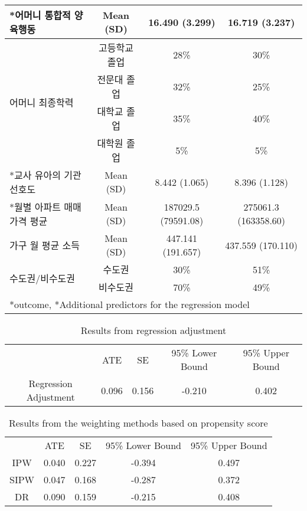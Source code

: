 \documentclass{article}
\begin{document}
\begin{table}[t]
{\begin{tabular}{l||c|c|c}
*어머니 통합적 양육행동             & Mean (SD) & 16.490 (3.299)      & 16.719 (3.237)       \\ \hline
\multirow{4}{*}{어머니 최종학력} & 고등학교 졸업   & 28\%                & 30\%                 \\ \cline{2-4} 
                          & 전문대 졸업    & 32\%                & 25\%                 \\ \cline{2-4} 
                          & 대학교 졸업    & 35\%                & 40\%                 \\ \cline{2-4} 
                          & 대학원 졸업    & 5\%                 & 5\%                  \\ \hline
*교사 유아의 기관선호도             & Mean (SD) & 8.442 (1.065)       & 8.396 (1.128)        \\ \hline
*월별 아파트 매매가격 평균            & Mean (SD) & 187029.5 (79591.08) & 275061.3 (163358.60) \\ \hline
가구 월 평균 소득                 & Mean (SD) & 447.141 (191.657)   & 437.559 (170.110)    \\ \hline
\multirow{2}{*}{수도권/비수도권} & 수도권       & 30\%                & 51\%                 \\ \cline{2-4} 
                          & 비수도권      & 70\%                & 49\%                 \\ \hline
\multicolumn{4}{l}{\scriptsize **outcome, *Additional predictors for the regression model}
\end{tabular}
}
\end{table}

\begin{table}[t]
\caption{{\color{ao}Results from regression adjustment}} \label{tbRA1}
\footnotesize
\centering
{\tabcolsep=16.5pt
\begin{tabular}{c||c|c|c|c}
\hline
     & ATE    & {\color{ao}SE}    & 95\% Lower Bound & 95\% Upper Bound \\ \hhline{=#=|=|=|=}
Regression Adjustment  & 0.096 & 0.156 & -0.210      & 0.402       \\ \hline
\end{tabular}}
\end{table}

\begin{table}[t]
\caption{Results from the weighting methods based on propensity score} \label{tb3}
\footnotesize
\centering
{\tabcolsep=22pt
\begin{tabular}{c||c|c|c|c}
\hline
     & ATE    & {\color{ao}SE}    & 95\% Lower Bound & 95\% Upper Bound \\ \hhline{=#=|=|=|=}
IPW  & 0.040 & 0.227 & -0.394      & 0.497       \\ \hline
SIPW & 0.047 & 0.168 & -0.287      & 0.372       \\ \hline
DR   & 0.090 & 0.159 & -0.215      & 0.408       \\ \hline
\end{tabular}}
\end{table}
\end{document}
